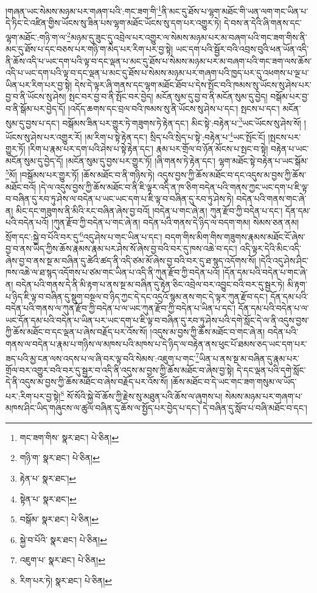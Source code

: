 །གཞན་ཡང་སེམས་མཉམ་པར་གཞག་པའི་:གང་ཟག་གི་\footnote{གང་ཟག་གིས་  སྣར་ཐང་།  པེ་ཅིན། }ནི་མང་དུ་ཐོས་པ་ལྷག་མཐོང་གི་ཡན་ལག་གང་ཡིན་པ་དེ་ཏིང་ངེ་འཛིན་གྱིས་ཡོངས་སུ་ཟིན་པས་ལྷག་མཐོང་ཡོངས་སུ་དག་པར་འགྱུར་ཏེ། དེ་བས་ན་དེའི་ཞི་གནས་དང་ལྷག་མཐོང་:གཉི་ག་ལ་\footnote{གཉི་ག་  སྣར་ཐང་།  པེ་ཅིན། }མཉམ་དུ་ཟུང་དུ་འབྲེལ་པར་འགྱུར་ལ་སེམས་མཉམ་པར་མ་བཞག་པའི་གང་ཟག་གིས་ནི་མང་དུ་ཐོས་པ་དང་བཅས་པར་གཉི་ག་མེད་པར་རིག་པར་བྱ་སྟེ། ཡང་དག་པའི་སྦྱོར་བའི་འབྲས་བུའི་ཕན་ཡོན་འདི་ནི་ཆོས་འདི་པ་ཡང་དག་པའི་ལྟ་བ་དང་ལྡན་པ་མང་དུ་ཐོས་པ་སེམས་མཉམ་པར་མ་བཞག་པའི་གང་ཟག་ལས་ཆོས་འདི་པ་ཡང་དག་པའི་ལྟ་བ་དང་ལྡན་པ་མང་དུ་ཐོས་པ་སེམས་མཉམ་པར་གཞག་པའི་ཁྱད་པར་དུ་འཕགས་པ་ལྔ་པ་ཡིན་པར་རིག་པར་བྱ་སྟེ། དེས་དེ་ལྟར་ཞི་གནས་དང་ལྷག་མཐོང་ཐོབ་པ་དེས་སྤོང་བའི་ཁམས་སུ་ཡོངས་སུ་ཤེས་པར་བྱ་བ་ནི་ཡོངས་སུ་ཤེས། སྤང་བར་བྱ་བ་ནི་སྤོང་བར་བྱེད། མངོན་སུམ་དུ་བྱ་བ་ནི་མངོན་སུམ་དུ་བྱེད། བསྒོམ་པར་བྱ་བ་ནི་སྒོམ་པར་བྱེད་དོ། །འདོད་ཆགས་དང་བྲལ་བའི་ཁམས་སུ་ནི་ཡོངས་སུ་ཤེས་པ་དང་། སྤངས་པ་དང་། མངོན་སུམ་དུ་བྱས་པ་དང་། བསྒོམས་ཟིན་པར་གྱུར་ཏེ་གཟུགས་ཏེ་རྟེན་དང་། མིང་སྟེ་:བརྟེན་པ་\footnote{རྟེན་པ་  སྣར་ཐང་། }ཡང་ཡོངས་སུ་ཤེས་སོ། །ཡོངས་སུ་ཤེས་པར་འགྱུར་རོ། །མ་རིག་པ་སྟེ་རྟེན་དང་། སྲིད་པའི་སྲེད་པ་སྟེ་:བརྟེན་པ་\footnote{སྟེན་པ་  སྣར་ཐང་། }ཡང་སྤོང་ངོ། །སྤངས་པར་གྱུར་ཏོ། །རིག་པ་རྣམ་པར་དག་པའི་ཤེས་པ་སྟེ་རྟེན་དང་། རྣམ་པར་གྲོལ་བ་ཉོན་མོངས་པ་སྤང་བ་སྟེ། བརྟེན་པ་ཡང་མངོན་སུམ་དུ་བྱེད་དོ། །མངོན་སུམ་དུ་བྱས་པར་གྱུར་ཏོ། །ཞི་གནས་ཏེ་རྟེན་དང་། ལྷག་མཐོང་སྟེ་བརྟེན་པ་ཡང་སྒོམ་\footnote{བསྒོམ་  སྣར་ཐང་།  པེ་ཅིན། }མོ། །བསྒོམས་པར་གྱུར་ཏོ། །ཆོས་མཐོང་བ་ནི་གཉིས་ཏེ། འདུས་བྱས་ཀྱི་ཆོས་མཐོང་བ་དང་འདུས་མ་བྱས་ཀྱི་ཆོས་མཐོང་བའོ། །དེ་ལ་འདུས་བྱས་ཀྱི་ཆོས་མཐོང་བ་ནི་ཇི་ལྟར་འདི་ན་ཁ་ཅིག་བདེན་པའི་གནས་ཀྱང་ཡང་དག་པ་ཇི་ལྟ་བ་བཞིན་དུ་རབ་ཏུ་ཤེས་ལ་བདེན་པ་ཡང་ཡང་དག་པ་ཇི་ལྟ་བ་བཞིན་དུ་རབ་ཏུ་ཤེས་ཏེ། བདེན་པའི་གནས་གང་ཞེ་ན། མིང་དང་གཟུགས་ནི་མིའི་རང་བཞིན་ཞེས་བྱ་བའོ། །བདེན་པ་གང་ཞེ་ན། ཀུན་རྫོབ་ཀྱི་བདེན་པ་དང་། དོན་དམ་པའི་བདེན་པའོ། །ཀུན་རྫོབ་ཀྱི་བདེན་པ་གང་ཞེ་ན། བདེན་པའི་གནས་དེ་ཉིད་ལ་བདག་གམ། སེམས་ཅན་ནམ། སྲོག་དང་:སྐྱེ་བ་པོའི་བར་དུ་\footnote{སྐྱེ་བ་པོའི་  སྣར་ཐང་།  པེ་ཅིན། }འདུ་ཤེས་པ་གང་ཡིན་པ་དང་། བདག་གིས་མིག་གིས་གཟུགས་རྣམས་མཐོང་ངོ་ཞེས་བྱ་བ་ནས་ཡིད་ཀྱིས་ཆོས་རྣམས་རྣམ་པར་ཤེས་སོ་ཞེས་བྱ་བའི་བར་དུ་ཁས་འཆེ་བ་དང་། འདི་ལྟར་དེའི་མིང་འདི་ཞེས་བྱ་བ་ནས་སྔ་མ་བཞིན་དུ་ཚེའི་ཚད་ནི་འདི་ཙམ་མོ་ཞེས་བྱ་བའི་བར་དུ་ཐ་སྙད་འདོགས་སོ། །དེའི་འདུ་ཤེས་ཤིང་ཁས་འཆེ་ལ་ཐ་སྙད་འདོགས་པ་ཙམ་གང་ཡིན་པ་འདི་ནི་ཀུན་རྫོབ་ཀྱི་བདེན་པའོ། །དོན་དམ་པའི་བདེན་པ་གང་ཞེ་ན། བདེན་པའི་གནས་དེ་ནི་མི་རྟག་པ་ནས་སྔ་མ་བཞིན་དུ་རྟེན་ཅིང་འབྲེལ་བར་འབྱུང་བའི་བར་དུ་སྦྱར་ཏེ། མི་རྟག་པ་ཉིད་ཇི་ལྟ་བ་བཞིན་དུ་སྡུག་བསྔལ་བ་ཉིད་ཀྱང་དེ་དང་འདྲའོ་སྙམ་ནས་གང་དེ་ལྟར་ཀུན་རྫོབ་དང་། དོན་དམ་པའི་བདེན་པའི་གནས་ལ་ཀུན་རྫོབ་ཀྱི་བདེན་པ་ལ་ཡང་ཀུན་རྫོབ་ཀྱི་བདེན་པ་ཡིན་པ་དང་། དོན་དམ་པའི་བདེན་པ་ལ་ཡང་དོན་དམ་པའི་བདེན་པ་ཡིན་པར་ཡང་དག་པ་ཇི་ལྟ་བ་བཞིན་དུ་རབ་ཏུ་ཤེས་པའི་དགེ་སློང་དེ་ལ་ནི་འདུས་བྱས་ཀྱི་ཆོས་མཐོང་བ་དང་ལྡན་པ་ཞེས་བརྗོད་པར་འོས་སོ། །འདུས་མ་བྱས་ཀྱི་ཆོས་མཐོང་བ་གང་ཞེ་ན། བདེན་པའི་གནས་ལ་བདེན་པ་རྣམ་པ་གཉིས་ལ་མཁས་པའི་མཁས་པ་དེ་ཉིད་ལ་བརྟེན་ནས་ཕུང་པོ་ཐམས་ཅད་ཡང་དག་པར་ཟད་པའི་མྱ་ངན་ལས་འདས་པ་ལ་ཞི་བར་ལྟ་བའི་སེམས་:འཇུག་པ་གང་\footnote{འཇུག་པ་  སྣར་ཐང་།  པེ་ཅིན། }ཡིན་པ་ནས་སྔ་མ་བཞིན་དུ་རྣམ་པར་གྲོལ་བར་འགྱུར་བའི་བར་དུ་སྦྱར་བ་འདི་ནི་འདུས་མ་བྱས་ཀྱི་ཆོས་མཐོང་བ་ཞེས་བྱ་སྟེ། དེ་དང་ལྡན་པའི་དགེ་སློང་དེ་ནི་འདུས་མ་བྱས་ཀྱི་ཆོས་མཐོང་བ་ཞེས་བརྗོད་པར་འོས་སོ། །ཆོས་མཐོང་བ་དེ་ཡང་གང་ཟག་གསུམ་ལ་ཡོད་པར་:རིག་པར་བྱ་སྟེ།\footnote{རིག་པར་ཏེ།  སྣར་ཐང་།  པེ་ཅིན། } སོ་སོའི་སྐྱེ་བོ་ཆོས་ཀྱི་རྗེས་སུ་མཐུན་པའི་ཆོས་ལ་ཞུགས་པ། སེམས་མཉམ་པར་གཞག་པ་མཁས་ཤིང་ཡིད་གཞུངས་ལ་ཚུལ་བཞིན་དུ་ཆོས་ལ་སྤྱོད་པར་བྱེད་པ་དང་། དེ་བཞིན་དུ་སློབ་པ་བཞི་མཐོང་བ་དང་། 